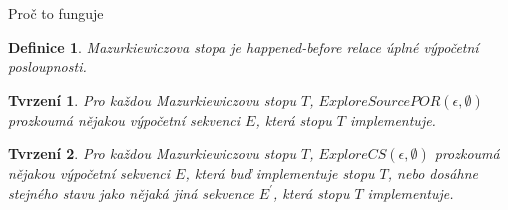 \documentclass[11pt]{beamer}
\newtheorem{dfn}{Definice}
\newtheorem{tvrzeni}{Tvrzení}
\begin{document}
\begin{frame}{Proč to funguje}
\pause
\begin{dfn}
Mazurkiewiczova stopa je happened-before relace úplné výpočetní posloupnosti.
\end{dfn}

\pause
\begin{tvrzeni}
Pro každou Mazurkiewiczovu stopu $T$, $\textit{ExploreSourcePOR}(\epsilon, \emptyset)$
prozkoumá nějakou výpočetní sekvenci $E$, která stopu $T$ implementuje.
\end{tvrzeni}

\pause
\begin{tvrzeni}
Pro každou Mazurkiewiczovu stopu $T$, $\textit{ExploreCS}(\epsilon, \emptyset)$
prozkoumá nějakou výpočetní sekvenci $E$, která buď implementuje stopu $T$,
nebo dosáhne stejného stavu jako nějaká jiná sekvence $E^\prime$, která stopu $T$ implementuje.
\end{tvrzeni}

%
\end{frame}
\end{document}

